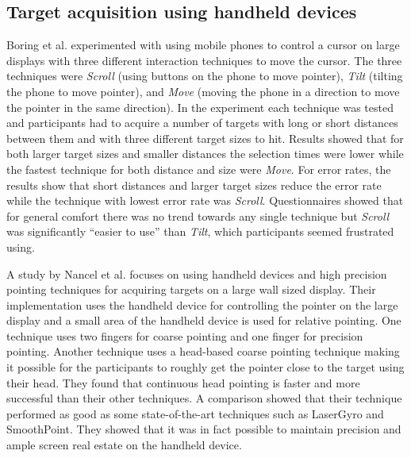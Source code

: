 \subsection{Target acquisition using handheld devices} \label{sec:midAirPointingHandheld}
Boring et al. \cite{Boring:2009} experimented with using mobile phones to control a cursor on large displays with three different interaction techniques to move the cursor.
The three techniques were \emph{Scroll} (using buttons on the phone to move pointer), \emph{Tilt} (tilting the phone to move pointer), and \emph{Move} (moving the phone in a direction to move the pointer in the same direction).
In the experiment each technique was tested and participants had to acquire a number of targets with long or short distances between them and with three different target sizes to hit.
Results showed that for both larger target sizes and smaller distances the selection times were lower while the fastest technique for both distance and size were \emph{Move}.
For error rates, the results show that short distances and larger target sizes reduce the error rate while the technique with lowest error rate was \emph{Scroll}.
Questionnaires showed that for general comfort there was no trend towards any single technique but \emph{Scroll} was significantly ``easier to use'' than \emph{Tilt}, which participants seemed frustrated using.

A study by Nancel et al. \cite{Nancel:2013} focuses on using handheld devices and high precision pointing techniques for acquiring targets on a large wall sized display.
Their implementation uses the handheld device for controlling the pointer on the large display and a small area of the handheld device is used for relative pointing.
One technique uses two fingers for coarse pointing and one finger for precision pointing. 
Another technique uses a head-based coarse pointing technique making it possible for the participants to roughly get the pointer close to the target using their head.
They found that continuous head pointing is faster and more successful than their other techniques.
A comparison showed that their technique performed as good as some state-of-the-art techniques such as LaserGyro\cite{Vogel:2005} and SmoothPoint\cite{Gallo:2012}. 
They showed that it was in fact possible to maintain precision and ample screen real estate on the handheld device.

